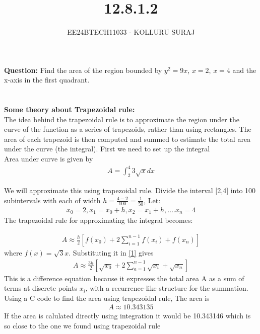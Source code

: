 \documentclass[journal]{IEEEtran}
\numberwithin{equation}{enumi}
\numberwithin{figure}{enumi}
\begin{document}

\title{12.8.1.2}
\author{EE24BTECH11033 - KOLLURU SURAJ}
{\let\newpage\relax\maketitle}
\textbf{Question:} 
Find the area of the region bounded by $y^2=9x$, $x=2$, $x=4$ and the x-axis in the first quadrant.
\\\\
\solution\\
\textbf{Some theory about Trapezoidal rule:}\\
The idea behind the trapezoidal rule is to approximate the region under the curve of the function as a series of trapezoids, rather than using rectangles. The area of each trapezoid is then computed and summed to estimate the total area under the curve (the integral).
First we need to set up the integral\\
Area under curve is given by
\begin{align}
    A= \int_{2}^{4} 3\sqrt{x}dx
\end{align}

We will approximate this using trapezoidal rule. Divide the interval [2,4] into 100 subintervals with each of width $h=\frac{4-2}{100}=\frac{1}{50}$, Let:
\begin{align}
x_0=2,x_1=x_0+h,x_2=x_1+h,....x_n=4
\end{align}
The trapezoidal rule for approximating the integral becomes:

\begin{align}
    A \approx\frac{h}{2}[f(x_0)+ 2\sum_{i=1}^{n-1} f(x_i) +f(x_n)]\label{1}
\end{align}
where $f(x)= \sqrt{3}x$. Substituting it in \ref{1} gives
\begin{align}
     A \approx\frac{3h}{2}[\sqrt{x_0}+ 2\sum_{a=1}^{n-1} \sqrt{x_i} +\sqrt{x_n}]
\end{align}
This is a difference equation because it expresses the total area A as a sum of terms at discrete points $x_i$, with a recurrence-like structure for the summation.\\
Using a C code to find the area using trapezoidal rule, The area is
\begin{align}
    A\approx 10.343135
\end{align}
If the area is calulated directly using integration it would be 10.343146 which is so close to the one we found using trapezoidal rule
\end{document}
